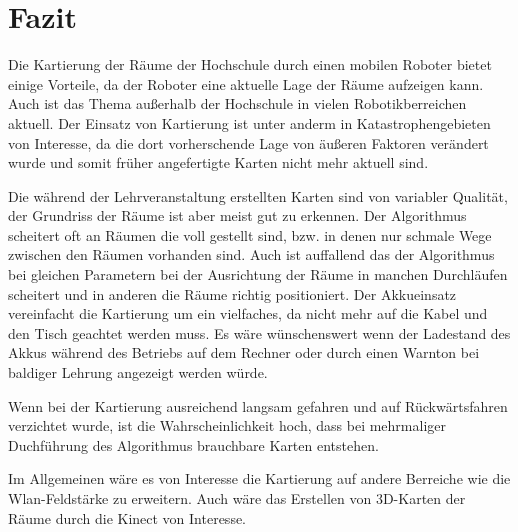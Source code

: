 \chapter{Fazit} %
\label{cha:fazit}

Die Kartierung der Räume der Hochschule durch einen mobilen Roboter bietet einige Vorteile, da der Roboter eine aktuelle Lage der Räume aufzeigen kann. Auch ist das Thema außerhalb der Hochschule in vielen Robotikberreichen aktuell. Der Einsatz von Kartierung ist unter anderm in Katastrophengebieten von Interesse, da die dort vorherschende Lage von äußeren Faktoren verändert wurde und somit früher angefertigte Karten nicht mehr aktuell sind.\par
Die während der Lehrveranstaltung erstellten Karten sind von variabler Qualität, der Grundriss der Räume ist aber meist gut zu erkennen. Der Algorithmus scheitert oft an Räumen die voll gestellt sind, bzw. in denen nur schmale Wege zwischen den Räumen vorhanden sind. Auch ist auffallend das der Algorithmus bei gleichen Parametern bei der Ausrichtung der Räume in manchen Durchläufen scheitert und in anderen die Räume richtig positioniert. Der Akkueinsatz vereinfacht die Kartierung um ein vielfaches, da nicht mehr auf die Kabel und den Tisch geachtet werden muss. Es wäre wünschenswert wenn der Ladestand des Akkus während des Betriebs auf dem Rechner oder durch einen Warnton bei baldiger Lehrung angezeigt werden würde.\par
Wenn bei der Kartierung ausreichend langsam gefahren und auf Rückwärtsfahren verzichtet wurde, ist die Wahrscheinlichkeit hoch, dass bei mehrmaliger Duchführung des Algorithmus brauchbare Karten entstehen.\par
Im Allgemeinen wäre es von Interesse die Kartierung auf andere Berreiche wie die Wlan-Feldstärke zu erweitern. Auch wäre das Erstellen von 3D-Karten der Räume durch die Kinect von Interesse.

